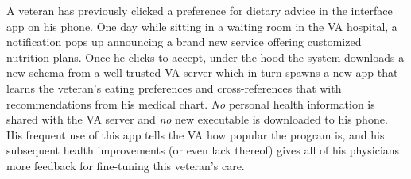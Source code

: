 %
%
%

A veteran has previously clicked a preference for dietary advice in the \projectName interface app on his phone.
One day while sitting in a waiting room in the VA hospital, a notification pops up announcing a brand new service offering customized nutrition plans.
Once he clicks to accept, under the hood the system downloads a new schema from a well-trusted VA server which in turn spawns a new app that learns the veteran's eating preferences and cross-references that with recommendations from his medical chart.
\emph{No} personal health information is shared with the VA server and \emph{no} new executable is downloaded to his phone.
His frequent use of this app tells the VA how popular the program is, and his subsequent health improvements (or even lack thereof) gives all of his physicians more feedback for fine-tuning this veteran's care.
